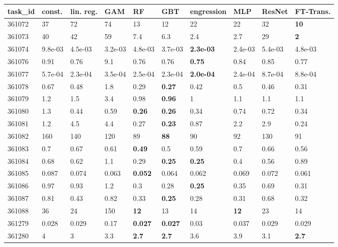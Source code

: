 \begin{table}[ht!]
\centering
\begingroup\footnotesize
\begin{tabular}{llllllllll}
  \hline
\hline
task\_id & const. & lin. reg. & GAM & RF & GBT & engression & MLP & ResNet & FT-Trans. \\ 
  \hline
361072 & 37 & 72 & 74 & 13 & 12 & 22 & 22 & 32 & \textbf{10} \\ 
  361073 & 40 & 42 & 59 & 7.4 & 6.3 & 2.4 & 2.7 & 29 & \textbf{2} \\ 
  361074 & 9.8e-03 & 4.5e-03 & 3.2e-03 & 4.8e-03 & 3.7e-03 & \textbf{2.3e-03} & 2.4e-03 & 5.4e-03 & 4.8e-03 \\ 
  361076 & 0.91 & 0.76 & 9.1 & 0.76 & 0.76 & \textbf{0.75} & 0.84 & 0.85 & 0.77 \\ 
  361077 & 5.7e-04 & 2.3e-04 & 3.5e-04 & 2.5e-04 & 2.3e-04 & \textbf{2.0e-04} & 2.4e-04 & 8.7e-04 & 8.8e-04 \\ 
  361078 & 0.67 & 0.48 & 1.8 & 0.29 & \textbf{0.27} & 0.42 & 0.5 & 0.46 & 0.31 \\ 
  361079 & 1.2 & 1.5 & 3.4 & 0.98 & \textbf{0.96} & 1 & 1.1 & 1.1 & 1.1 \\ 
  361080 & 1.3 & 0.44 & 0.59 & \textbf{0.26} & \textbf{0.26} & 0.34 & 0.74 & 0.72 & 0.34 \\ 
  361081 & 1.2 & 4.5 & 4.4 & 0.27 & \textbf{0.23} & 0.87 & 2.2 & 2.9 & 0.24 \\ 
  361082 & 160 & 140 & 120 & 89 & \textbf{88} & 90 & 92 & 130 & 91 \\ 
  361083 & 0.7 & 0.67 & 0.61 & \textbf{0.49} & 0.5 & 0.59 & 0.7 & 0.66 & 0.56 \\ 
  361084 & 0.68 & 0.62 & 1.1 & 0.29 & \textbf{0.25} & \textbf{0.25} & 0.4 & 0.56 & 0.89 \\ 
  361085 & 0.087 & 0.074 & 0.063 & \textbf{0.052} & 0.064 & 0.062 & 0.069 & 0.072 & 0.061 \\ 
  361086 & 0.97 & 0.93 & 1.2 & 0.3 & 0.28 & \textbf{0.25} & 0.35 & 0.69 & 0.31 \\ 
  361087 & 0.81 & 0.43 & 0.82 & 0.33 & \textbf{0.25} & 0.28 & 0.31 & 0.68 & 0.32 \\ 
  361088 & 36 & 24 & 150 & \textbf{12} & 13 & 14 & \textbf{12} & 23 & 14 \\ 
  361279 & 0.028 & 0.029 & 0.17 & \textbf{0.027} & \textbf{0.027} & 0.03 & 0.037 & 0.029 & 0.029 \\ 
  361280 & 4 & 3 & 3.3 & \textbf{2.7} & \textbf{2.7} & 3.6 & 3.9 & 3.1 & \textbf{2.7} \\ 

\end{tabular}
\end{table}
